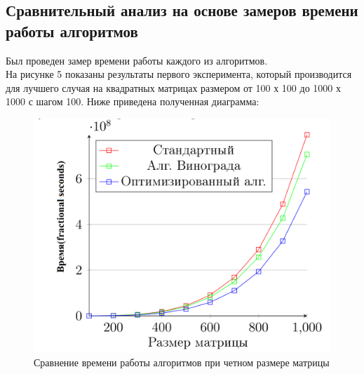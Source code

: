 \documentclass[a4paper, 12pt]{article}
\begin{document}
\begin{flushleft}
	\subsection{Сравнительный анализ на основе замеров времени работы алгоритмов}
	Был проведен замер времени работы каждого из алгоритмов.
	\\ \hspace*{5mm} На рисунке 5 показаны результаты первого эксперимента, который производится для лучшего случая на квадратных матрицах размером от 100 х 100 до 1000 х 1000 с шагом 100. Ниже приведена полученная диаграмма:
	\clearpage
	\newpage
	\begin{figure}[h]
		\centering \includegraphics[scale=0.85]{time1}
		\centering\caption{Сравнение времени работы алгоритмов при четном размере матрицы}
	\end{figure}
	

\end{flushleft}
\end{document}
